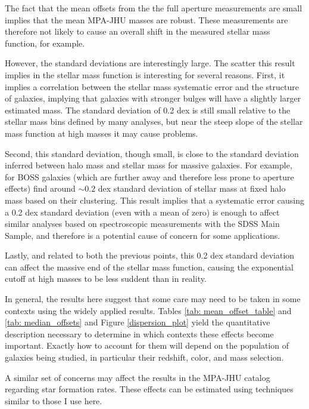 The fact that the mean offsets from the the full aperture measurements 
are small implies that the mean MPA-JHU masses are robust. These 
measurements are therefore not likely to cause an overall shift in the
measured stellar mass function, for example. 

However, the standard deviations are interestingly large. The scatter
this result implies in the stellar mass function is interesting for 
several reasons. First, it implies a correlation between the
stellar mass systematic error and the structure of galaxies, 
implying that galaxies with stronger bulges will have a slightly 
larger estimated mass. The standard deviation of 0.2 dex is still
small relative to the stellar mass bins defined by many analyses, 
but near the steep slope of the stellar mass function at high 
masses it may cause problems.

Second, this standard deviation, though small, is close to the 
standard deviation inferred between halo mass and stellar mass
for massive galaxies. For example, for BOSS galaxies
(which are further away and therefore less prone to 
aperture effects) \citealt{tinker17a} find around $\sim0.2$ dex 
standard deviation of stellar mass at fixed halo mass
based on their clustering. This result implies that a 
systematic error causing a 0.2 dex standard deviation 
(even with a mean of zero) is enough to affect similar analyses 
based on spectroscopic measurements with the SDSS Main Sample,
and therefore is a potential cause of concern for some 
applications.

Lastly, and related to both the previous points, this 0.2 dex 
standard deviation can affect the massive end of the stellar
mass function, causing the exponential cutoff at high masses 
to be less suddent than in reality.

In general, the results here suggest that some care may need 
to be taken in some contexts using the widely applied 
\citet{kauffmann_stellar_2003} 
results. Tables \ref{tab: mean_offset_table} 
and  \ref{tab: median_offsets} and Figure \ref{dispersion_plot} yield 
the quantitative description necessary to determine in which 
contexts these effects become important. Exactly how to account for
them will depend on the population of galaxies being studied, in 
particular their redshift, color, and mass selection. 

A similar set of concerns may affect the \citet{brinchmann_physical_2004} results
in the MPA-JHU catalog regarding star formation rates. 
These effects can be estimated using techniques similar to those
I use here.


